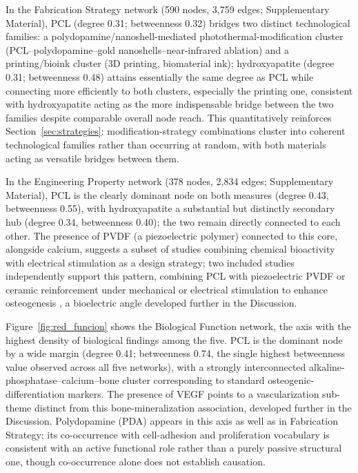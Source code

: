 \documentclass[5p,times,twocolumn]{elsarticle}
\begin{document}
In the Fabrication Strategy network (590 nodes, 3,759 edges; Supplementary Material), PCL (degree 0.31; betweenness 0.32) bridges two distinct technological families: a polydopamine/nanoshell-mediated photothermal-modification cluster (PCL--polydopamine--gold nanoshells--near-infrared ablation) and a printing/bioink cluster (3D printing, biomaterial ink); hydroxyapatite (degree 0.31; betweenness 0.48) attains essentially the same degree as PCL while connecting more efficiently to both clusters, especially the printing one, consistent with hydroxyapatite acting as the more indispensable bridge between the two families despite comparable overall node reach. This quantitatively reinforces Section~\ref{sec:strategies}: modification-strategy combinations cluster into coherent technological families rather than occurring at random, with both materials acting as versatile bridges between them.

In the Engineering Property network (378 nodes, 2,834 edges; Supplementary Material), PCL is the clearly dominant node on both measures (degree 0.43, betweenness 0.55), with hydroxyapatite a substantial but distinctly secondary hub (degree 0.34, betweenness 0.40); the two remain directly connected to each other. The presence of PVDF (a piezoelectric polymer) connected to this core, alongside calcium, suggests a subset of studies combining chemical bioactivity with electrical stimulation as a design strategy; two included studies independently support this pattern, combining PCL with piezoelectric PVDF or ceramic reinforcement under mechanical or electrical stimulation to enhance osteogenesis \cite{ref21,ref38}, a bioelectric angle developed further in the Discussion.

Figure~\ref{fig:red_funcion} shows the Biological Function network, the axis with the highest density of biological findings among the five. PCL is the dominant node by a wide margin (degree 0.41; betweenness 0.74, the single highest betweenness value observed across all five networks), with a strongly interconnected alkaline-phosphatase--calcium--bone cluster corresponding to standard osteogenic-differentiation markers. The presence of VEGF points to a vascularization sub-theme distinct from this bone-mineralization association, developed further in the Discussion. Polydopamine (PDA) appears in this axis as well as in Fabrication Strategy; its co-occurrence with cell-adhesion and proliferation vocabulary is consistent with an active functional role rather than a purely passive structural one, though co-occurrence alone does not establish causation.
\end{document}

